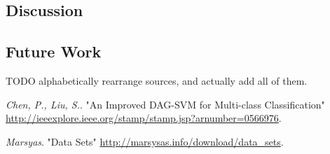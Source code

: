 \documentclass{article} %
\begin{document}
\subsection{Discussion}

\subsection{Future Work}


TODO alphabetically rearrange sources, and actually add all of them.
\begin{thebibliography}{9}
  \emph{Chen, P., Liu, S.}.
  "An Improved DAG-SVM for Multi-class Classification"
  \url{http://ieeexplore.ieee.org/stamp/stamp.jsp?arnumber=0566976}.

  \emph{Marsyas}.
  "Data Sets"
  \url{http://marsysas.info/download/data\_sets}.

\end{thebibliography}
\end{document}
